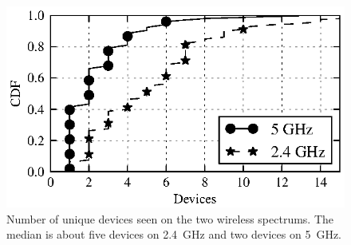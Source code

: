 \begin{figure}[t]
  \begin{minipage}{\linewidth}
  \includegraphics{figures/cdf_clients_all}
  \caption{Number of unique devices seen on the two wireless
    spectrums. The median is about five devices on 2.4~GHz and two
    devices on 5~GHz.} 
  \label{fig:cdf-devices}
  \end{minipage}
\end{figure}

